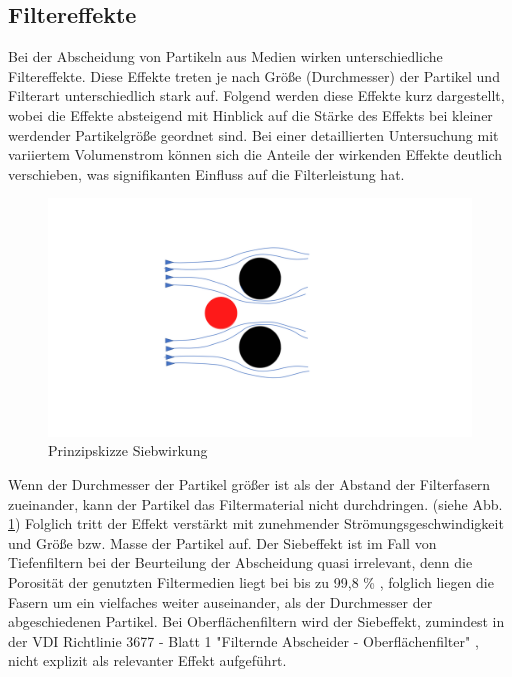 \subsection{Filtereffekte}
\label{sec:filtereffekte}
Bei der Abscheidung von Partikeln aus Medien wirken unterschiedliche Filtereffekte. Diese Effekte treten je nach Größe (Durchmesser) der Partikel und Filterart unterschiedlich stark auf. Folgend werden diese Effekte kurz dargestellt, wobei die Effekte absteigend mit Hinblick auf die Stärke des Effekts bei kleiner werdender Partikelgröße geordnet sind. Bei einer detaillierten Untersuchung mit variiertem Volumenstrom können sich die Anteile der wirkenden Effekte deutlich verschieben, was signifikanten Einfluss auf die Filterleistung hat.
\begin{figure}[H]
    \begin{center}
        \includegraphics[width=\linewidth]{images/sieb2.png}
        \caption[Siebwirkung]{Prinzipskizze Siebwirkung}
        \label{fi:siebwirkung}
    \end{center}
\end{figure}
Wenn der Durchmesser der Partikel größer ist als der Abstand der Filterfasern zueinander, kann der Partikel das Filtermaterial nicht durchdringen. (siehe Abb. \ref{fi:siebwirkung}) Folglich tritt der Effekt verstärkt mit zunehmender Strömungsgeschwindigkeit und Größe bzw. Masse der Partikel auf. Der Siebeffekt ist im Fall von Tiefenfiltern bei der Beurteilung der Abscheidung quasi irrelevant, denn die Porosität der genutzten Filtermedien liegt bei bis zu 99,8 \% , folglich liegen die Fasern um ein vielfaches weiter auseinander, als der Durchmesser der abgeschiedenen Partikel. \cite{vdi3677_2} Bei Oberflächenfiltern wird der Siebeffekt, zumindest in der VDI Richtlinie 3677 - Blatt 1 "Filternde Abscheider - Oberflächenfilter" \cite{vdi3677_1}, nicht explizit als relevanter Effekt aufgeführt. 
